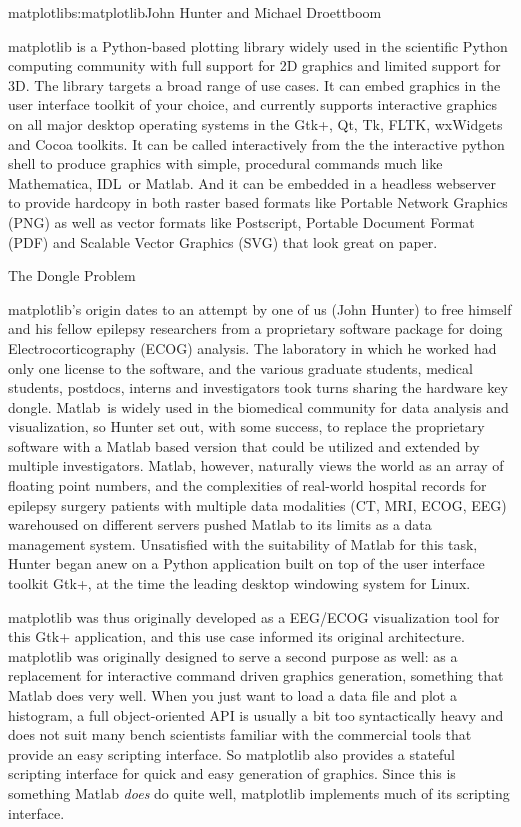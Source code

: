 \begin{aosachapter}{matplotlib}{s:matplotlib}{John Hunter and Michael Droettboom}

matplotlib is a Python-based plotting library widely used in the
scientific Python computing community with full support for 2D
graphics and limited support for 3D.  The library targets a broad
range of use cases.  It can embed graphics in the user interface
toolkit of your choice, and currently supports interactive graphics on
all major desktop operating systems in the Gtk+, Qt, Tk, FLTK,
wxWidgets and Cocoa toolkits.  It can be called interactively from the
the interactive python shell to produce graphics with simple,
procedural commands much like Mathematica\texttrademark,
IDL\texttrademark\ or Matlab\texttrademark.  And it can be embedded in
a headless webserver to provide hardcopy in both raster based formats
like Portable Network Graphics (PNG) as well as vector formats like
Postscript, Portable Document Format (PDF) and Scalable Vector
Graphics (SVG) that look great on paper.

\begin{aosasect1}{The Dongle Problem}

matplotlib's origin dates to an attempt by one of us (John Hunter) to
free himself and his fellow epilepsy researchers from a proprietary
software package for doing Electrocorticography (ECOG) analysis.  The
laboratory in which he worked had only one license to the software,
and the various graduate students, medical students, postdocs, interns
and investigators took turns sharing the hardware key dongle.
Matlab\texttrademark\ is widely used in the biomedical community for
data analysis and visualization, so Hunter set out, with some success,
to replace the proprietary software with a Matlab based version that
could be utilized and extended by multiple investigators.  Matlab,
however, naturally views the world as an array of floating point
numbers, and the complexities of real-world hospital records for
epilepsy surgery patients with multiple data modalities (CT, MRI,
ECOG, EEG) warehoused on different servers pushed Matlab to its limits
as a data management system.  Unsatisfied with the suitability of
Matlab for this task, Hunter began anew on a Python application built
on top of the user interface toolkit Gtk+, at the time the leading
desktop windowing system for Linux.

matplotlib was thus originally developed as a EEG/ECOG visualization
tool for this Gtk+ application, and this use case informed its
original architecture.  matplotlib was originally designed to serve a
second purpose as well: as a replacement for interactive command
driven graphics generation, something that Matlab does very well.
When you just want to load a data file and plot a histogram, a full
object-oriented API is usually a bit too syntactically heavy and does
not suit many bench scientists familiar with the commercial tools that
provide an easy scripting interface.  So matplotlib also provides a
stateful scripting interface for quick and easy generation of
graphics.  Since this is something Matlab \emph{does} do quite well,
matplotlib implements much of its scripting interface.


\end{aosasect1}
\end{aosachapter}
